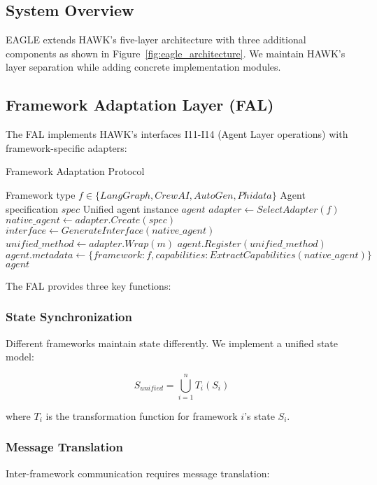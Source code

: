 \documentclass[conference]{IEEEtran}
\begin{document}
\subsection{System Overview}

EAGLE extends HAWK's five-layer architecture with three additional components as shown in Figure~\ref{fig:eagle_architecture}. We maintain HAWK's layer separation while adding concrete implementation modules.



\subsection{Framework Adaptation Layer (FAL)}

The FAL implements HAWK's interfaces I11-I14 (Agent Layer operations) with framework-specific adapters:

\begin{algorithm}
\caption{Framework Adaptation Protocol}
\label{alg:fal}
\begin{algorithmic}[1]
\REQUIRE Framework type $f \in \{LangGraph, CrewAI, AutoGen, Phidata\}$
\REQUIRE Agent specification $spec$
\ENSURE Unified agent instance $agent$
\STATE $adapter \gets SelectAdapter(f)$
\STATE $native\_agent \gets adapter.Create(spec)$
\STATE $interface \gets GenerateInterface(native\_agent)$
    \STATE $unified\_method \gets adapter.Wrap(m)$
    \STATE $agent.Register(unified\_method)$
\ENDFOR
\STATE $agent.metadata \gets \{framework: f, capabilities: ExtractCapabilities(native\_agent)\}$
\RETURN $agent$
\end{algorithmic}
\end{algorithm}

The FAL provides three key functions:

\subsubsection{State Synchronization}
Different frameworks maintain state differently. We implement a unified state model:

\begin{equation}
S_{unified} = \bigcup_{i=1}^{n} T_i(S_i)
\end{equation}

where $T_i$ is the transformation function for framework $i$'s state $S_i$.

\subsubsection{Message Translation}
Inter-framework communication requires message translation:
\end{document}
